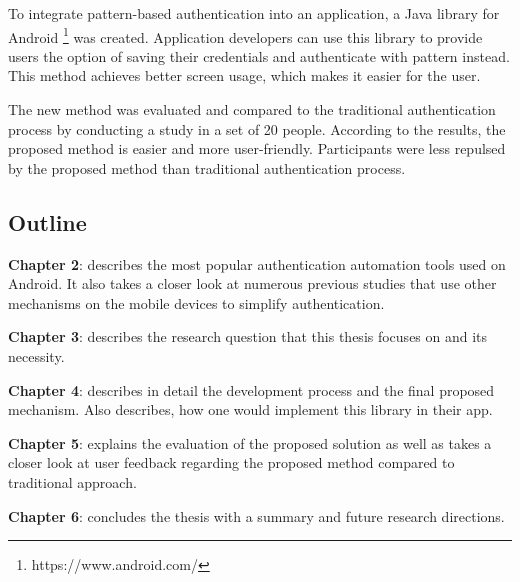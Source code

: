 To integrate pattern-based authentication into an application, a Java library for Android \footnote[3]{https://www.android.com/} was created. Application developers can use this library to provide users the option of saving their credentials and authenticate with pattern instead. This method achieves better screen usage, which makes it easier for the user. 

The new method was evaluated and compared to the traditional authentication process by conducting a study in a set of 20 people. According to the results, the proposed method is easier and more user-friendly. Participants were less repulsed by the proposed method than traditional authentication process.

\subsection{Outline}
\noindent \textbf{Chapter 2}: describes the most popular authentication automation tools used on Android. It also takes a closer look at numerous previous studies that use other mechanisms on the mobile devices to simplify authentication.

\noindent \textbf{Chapter 3}: describes the research question that this thesis focuses on and its necessity.

\noindent \textbf{Chapter 4}: describes in detail the development process and the final proposed mechanism. Also describes, how one would implement this library in their app.

\noindent \textbf{Chapter 5}: explains the evaluation of the proposed solution as well as takes a closer look at user feedback regarding the proposed method compared to traditional approach.

\noindent \textbf{Chapter 6}: concludes the thesis with a summary and future research directions.
